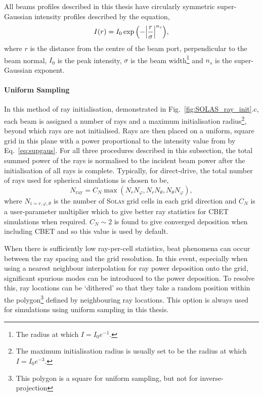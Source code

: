 All beams profiles described in this thesis have circularly symmetric super-Gaussian intensity profiles described by the equation,
\begin{equation}
    \label{eq:supgaus}
    I(r) = I_0 \exp{\Bigl( -\Bigl| \frac{r}{\sigma} \Bigr| ^{n_s} \Bigr)},
\end{equation}
where $r$ is the distance from the centre of the beam port, perpendicular to the beam normal, $I_0$ is the peak intensity, $\sigma$ is the beam width\footnote{The radius at which $I=I_0e^{-1}$.} and $n_s$ is the super-Gaussian exponent.

\paragraph*{Uniform Sampling}
In this method of ray initialisation, demonstrated in Fig.~\ref{fig:SOLAS_ray_init}.c, each beam is assigned a number of rays and a maximum initialisation radius\footnote{The maximum initialisation radius is usually set to be the radius at which $I=I_0e^{-3}$.}, beyond which rays are not initialised.
Rays are then placed on a uniform, square grid in this plane with a power proportional to the intensity value from by Eq.~\ref{eq:supgaus}.
For all three procedures described in this subsection, the total summed power of the rays is normalised to the incident beam power after the initialisation of all rays is complete.
Typically, for direct-drive, the total number of rays used for spherical simulations is chosen to be,
\begin{equation}
    \label{eq:SOLAS_nray_uniform}
    N_{\text{ray}} = C_{N}\max{(N_r N_{\varphi},N_r N_{\theta},N_{\theta} N_{\varphi})},
\end{equation}
where $N_{i=r,\varphi,\theta}$ is the number of \textsc{Solas} grid cells in each grid direction and $C_N$ is a user-parameter multiplier which to give better ray statistics for CBET simulations when required.
$C_N\sim 2$ is found to give converged deposition when including \ac{CBET} and so this value is used by default.

When there is sufficiently low ray-per-cell statistics, beat phenomena can occur between the ray spacing and the grid resolution.
In this event, especially when using a nearest neighbour interpolation for ray power deposition onto the grid, significant spurious modes can be introduced to the power deposition.
To resolve this, ray locations can be `dithered' so that they take a random position within the polygon\footnote{This polygon is a square for uniform sampling, but not for inverse-projection} defined by neighbouring ray locations.
This option is always used for simulations using uniform sampling in this thesis.

